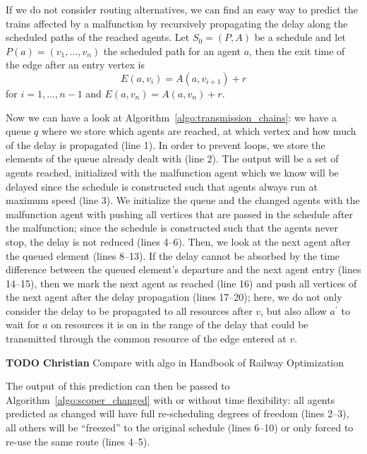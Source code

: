 \documentclass{article}
\begin{document}
If we do not consider routing alternatives, we can find an easy way to predict the trains affected by a malfunction by recursively propagating the delay along the scheduled paths of the reached agents.
%
Let $S_0=(P,A)$ be a schedule and let $P(a) = (v_1,\ldots,v_n)$ the scheduled path for an agent $a$, then  the exit time of the edge after an entry vertex is
\begin{equation}
E(a,v_i) = A(a,v_{i+1}) + r
\end{equation}
for $i=1,\ldots,n-1$ and $E(a,v_n) = A(a,v_n)+r$.

Now we can have a look at Algorithm~\ref{algo:transmission_chains}: we have a queue $q$ where we store which agents are reached, at which vertex and how much of the delay is propagated (line 1). In order to prevent loops, we store the elements of the queue already dealt with (line 2).  The output will be a set of agents reached, initialized with the malfunction agent which we know will be delayed since the schedule is constructed such that agents always run at maximum speed (line 3).
We initialize the queue and the changed agents with the malfunction agent with pushing all vertices that are passed in the schedule after the malfunction; since the schedule is constructed such that the agents never stop, the delay is not reduced (lines 4--6).
Then, we look at the next agent after the queued element (lines 8--13). If the delay cannot be absorbed by the time difference between the queued element's departure and the next agent entry (lines 14--15), then we mark the next agent as reached (line 16) and push all vertices of the next agent after the delay propagation (lines 17--20); here, we do not only consider the delay to be propagated to all resources after $v$, but also allow $a^\prime$ to wait for $a$ on resources it is on in the range of the delay that could be transmitted through the common resource of the edge entered at $v$.

\begin{mdframed}
\textbf{TODO Christian} Compare with algo in Handbook of Railway Optimization
\end{mdframed}

The output of this prediction can then be passed to Algorithm~\ref{algo:scoper_changed} with or without time flexibility: all agents predicted as changed will have full re-scheduling degrees of freedom (lines 2--3), all others will be ``freezed'' to the original schedule (lines 6--10) or only forced to re-use the same route (lines 4--5).
\end{document}
